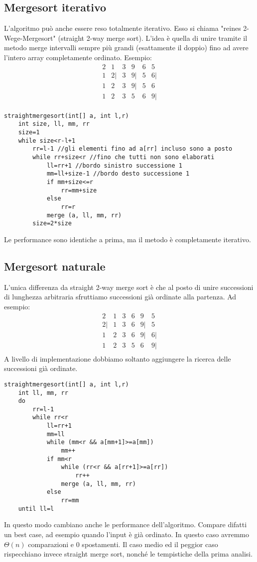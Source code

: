 \documentclass[a4paper]{book}
\begin{document}
\subsection*{Mergesort iterativo}
L'algoritmo può anche essere reso totalmente iterativo. Esso si chiama "reines 2-Wege-Mergesort" (straight 2-way merge sort). L'idea è quella di unire tramite il metodo merge intervalli sempre più grandi (esattamente il doppio) fino ad avere l'intero array completamente ordinato. Esempio:
\[\begin{array}{*{20}{c}}
{2}&1&{3}&{9}&6&5\\
1&{2|}&{3}&{9|}&5&{6|}\\
1&{2}&{3}&{9|}&5&6\\
1&{2}&{3}&5&{6}&{9|}\\
\end{array}\]
\begin{lstlisting}
straightmergesort(int[] a, int l,r)
	int size, ll, mm, rr
	size=1
	while size<r-l+1
		rr=l-1 //gli elementi fino ad a[rr] incluso sono a posto
		while rr+size<r //fino che tutti non sono elaborati
			ll=rr+1 //bordo sinistro successione 1
			mm=ll+size-1 //bordo desto successione 1
			if mm+size<=r
				rr=mm+size
			else
				rr=r
			merge (a, ll, mm, rr)
		size=2*size				
\end{lstlisting}
Le performance sono identiche a prima, ma il metodo è completamente iterativo.
\subsection*{Mergesort naturale}
L'unica differenza da straight 2-way merge sort è che al posto di unire successioni di lunghezza arbitraria sfruttiamo successioni già ordinate alla partenza. Ad esempio:
\[\begin{array}{*{20}{c}}
{2}&1&{3}&{6}&9&5\\
{2|}&{1}&{3}&{6}&{9|}&{5}\\
1&{2}&{3}&{6}&{9|}&{6|}\\
1&{2}&{3}&5&{6}&{9|}\\
\end{array}\]
A livello di implementazione dobbiamo soltanto aggiungere la ricerca delle successioni già ordinate.
\begin{lstlisting}
straightmergesort(int[] a, int l,r)
	int ll, mm, rr
	do
		rr=l-1
		while rr<r
			ll=rr+1
			mm=ll	
			while (mm<r && a[mm+1]>=a[mm])
				mm++
			if mm<r
				while (rr<r && a[rr+1]>=a[rr])
					rr++
				merge (a, ll, mm, rr)
			else
				rr=mm
	until ll=l								
\end{lstlisting}
In questo modo cambiano anche le performance dell'algoritmo. Compare difatti un best case, ad esempio quando l'input è già ordinato. In questo caso avremmo $\Theta (n)$ comparazioni e 0 spostamenti. Il caso medio ed il peggior caso rispecchiano invece straight merge sort, nonché le tempistiche della prima analisi.
\end{document}
